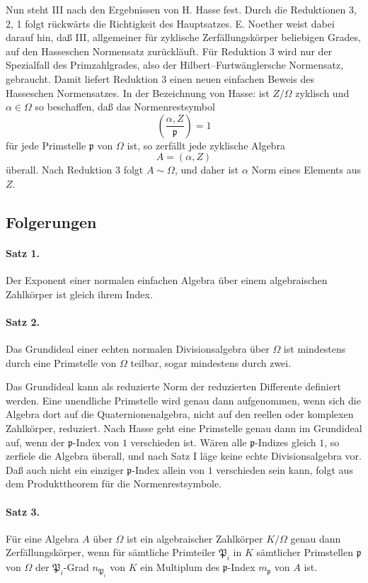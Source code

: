 \documentclass[11pt]{article}
\providecommand{\Om}{\Omega}
\begin{document}
Nun steht III nach den Ergebnissen von H. Hasse fest. Durch die Reduktionen 3, 2, 1 folgt rückwärts die Richtigkeit des Hauptsatzes. E. Noether weist dabei darauf hin, daß III, allgemeiner für zyklische Zerfällungskörper beliebigen Grades, auf den Hasseschen Normensatz zurückläuft. Für Reduktion 3 wird nur der Spezialfall des Primzahlgrades, also der Hilbert--Furtwänglersche Normensatz, gebraucht. Damit liefert Reduktion 3 einen neuen einfachen Beweis des Hasseschen Normensatzes. In der Bezeichnung von Hasse: ist \(Z/\Om\) zyklisch und \(\alpha\in\Om\) so beschaffen, daß das Normenrestsymbol
\[
        \left(\frac{\alpha,Z}{\mathfrak p}\right)=1
\]
für jede Primstelle \(\mathfrak p\) von \(\Om\) ist, so zerfällt jede zyklische Algebra
\[
        A=(\alpha,Z)
\]
überall. Nach Reduktion 3 folgt \(A\sim\Om\), und daher ist \(\alpha\) Norm eines Elements aus \(Z\).

\subsection*{Folgerungen}

\paragraph{Satz 1.}
Der Exponent einer normalen einfachen Algebra über einem algebraischen Zahlkörper ist gleich ihrem Index.

\paragraph{Satz 2.}
Das Grundideal einer echten normalen Divisionsalgebra über \(\Om\) ist mindestens durch eine Primstelle von \(\Om\) teilbar, sogar mindestens durch zwei.

Das Grundideal kann als reduzierte Norm der reduzierten Differente definiert werden. Eine unendliche Primstelle wird genau dann aufgenommen, wenn sich die Algebra dort auf die Quaternionenalgebra, nicht auf den reellen oder komplexen Zahlkörper, reduziert. Nach Hasse geht eine Primstelle genau dann im Grundideal auf, wenn der \(\mathfrak p\)-Index von \(1\) verschieden ist. Wären alle \(\mathfrak p\)-Indizes gleich \(1\), so zerfiele die Algebra überall, und nach Satz I läge keine echte Divisionsalgebra vor. Daß auch nicht ein einziger \(\mathfrak p\)-Index allein von \(1\) verschieden sein kann, folgt aus dem Produkttheorem für die Normenrestsymbole.

\paragraph{Satz 3.}
Für eine Algebra \(A\) über \(\Om\) ist ein algebraischer Zahlkörper \(K/\Om\) genau dann Zerfällungskörper, wenn für sämtliche Primteiler \(\mathfrak P_i\) in \(K\) sämtlicher Primstellen \(\mathfrak p\) von \(\Om\) der \(\mathfrak P_i\)-Grad \(n_{\mathfrak P_i}\) von \(K\) ein Multiplum des \(\mathfrak p\)-Index \(m_{\mathfrak p}\) von \(A\) ist.
\end{document}
